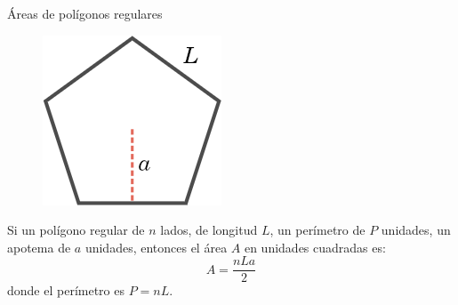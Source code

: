 \begin{infocard}{Áreas de polígonos regulares}
    \begin{figure}
        \centering
        \includegraphics[width=\linewidth]{../images/apotema.png}
    \end{figure}
    Si un polígono regular de $n$ lados, de longitud $L$, un perímetro de $P$
    unidades, un apotema de $a$ unidades, entonces el área $A$ en unidades
    cuadradas es:
    \[A=\dfrac{nLa}{2}\]
    donde el perímetro es $P=nL$.
\end{infocard}